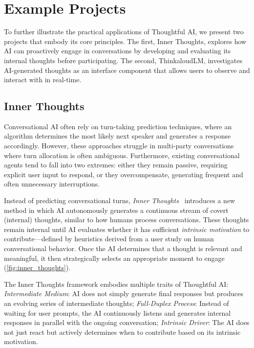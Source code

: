 \section{Example Projects}
To further illustrate the practical applications of Thoughtful AI, we present two projects that embody its core principles. The first, Inner Thoughts, explores how AI can proactively engage in conversations by developing and evaluating its internal thoughts before participating. The second, ThinkaloudLM, investigates AI-generated thoughts as an interface component that allows users to observe and interact with in real-time.

\subsection{Inner Thoughts}

Conversational AI often rely on turn-taking prediction techniques, where an algorithm determines the most likely next speaker and generates a response accordingly. However, these approaches struggle in multi-party conversations where turn allocation is often ambiguous. Furthermore, existing conversational agents tend to fall into two extremes: either they remain passive, requiring explicit user input to respond, or they overcompensate, generating frequent and often unnecessary interruptions.

Instead of predicting conversational turns, \textit{Inner Thoughts}~\cite{liu2025inner} introduces a new method in which AI autonomously generates a continuous stream of covert (internal) thoughts, similar to how humans process conversations. These thoughts remain internal until AI evaluates whether it has sufficient \textit{intrinsic motivation} to contribute---defined by heuristics derived from a user study on human conversational behavior. Once the AI determines that a thought is relevant and meaningful, it then strategically selects an appropriate moment to engage (\autoref{fig:inner_thoughts}).

The Inner Thoughts framework embodies multiple traits of Thoughtful AI:
\textit{Intermediate Medium}: AI does not simply generate final responses but produces an evolving series of intermediate thoughts; \textit{Full-Duplex Process}: Instead of waiting for user prompts, the AI continuously listens and generates internal responses in parallel with the ongoing conversation; \textit{Intrinsic Driver}: The AI does not just react but actively determines when to contribute based on its intrinsic motivation.

